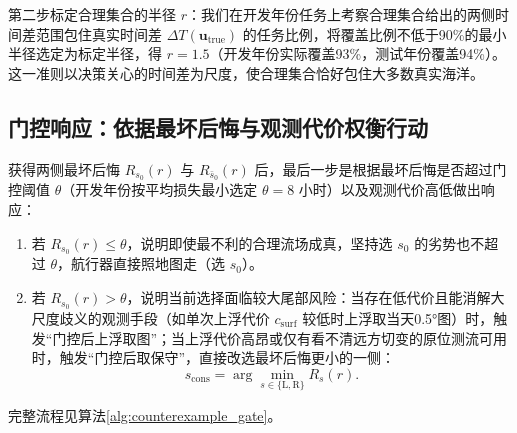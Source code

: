 第二步标定合理集合的半径 $r$：我们在开发年份任务上考察合理集合给出的两侧时间差范围包住真实时间差 $\Delta T(\boldsymbol{u}_{\text{true}})$ 的任务比例，将覆盖比例不低于90\%的最小半径选定为标定半径，得 $r = 1.5$（开发年份实际覆盖93\%，测试年份覆盖94\%）。这一准则以决策关心的时间差为尺度，使合理集合恰好包住大多数真实海洋。

\subsection{门控响应：依据最坏后悔与观测代价权衡行动}
获得两侧最坏后悔 $R_{s_0}(r)$ 与 $R_{\bar{s}_0}(r)$ 后，最后一步是根据最坏后悔是否超过门控阈值 $\theta$（开发年份按平均损失最小选定 $\theta = 8$ 小时）以及观测代价高低做出响应：
\begin{enumerate}
    \item 若 $R_{s_0}(r) \le \theta$，说明即使最不利的合理流场成真，坚持选 $s_0$ 的劣势也不超过 $\theta$，航行器直接照地图走（选 $s_0$）。
    \item 若 $R_{s_0}(r) > \theta$，说明当前选择面临较大尾部风险：当存在低代价且能消解大尺度歧义的观测手段（如单次上浮代价 $c_{\text{surf}}$ 较低时上浮取当天0.5°图）时，触发“门控后上浮取图”；当上浮代价高昂或仅有看不清远方切变的原位测流可用时，触发“门控后取保守”，直接改选最坏后悔更小的一侧：
    \begin{equation}
    s_{\text{cons}} = \arg\min_{s \in \{\text{L}, \text{R}\}} R_s(r).
    \label{eq:conservative_choice}
    \end{equation}
\end{enumerate}
完整流程见算法\ref{alg:counterexample_gate}。


